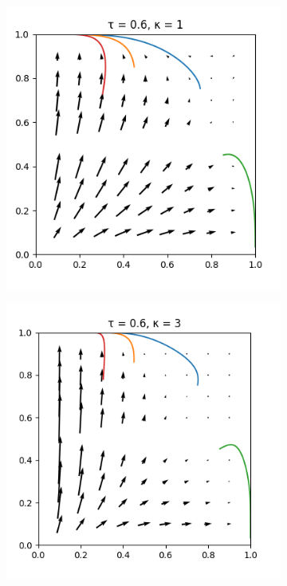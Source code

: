 \documentclass[10pt,a4paper]{article}
\begin{document}
\begin{figure}[h]
    \centering
    \begin{subfigure}[b]{0.30\textwidth}
        \includegraphics[width=\textwidth]{Figures/boltzmann_bots_1.png}
    \end{subfigure}
    \begin{subfigure}[b]{0.30\textwidth}
        \includegraphics[width=\textwidth]{Figures/boltzmann_bots_3.png}

\end{subfigure}
\end{figure}
\end{document}
